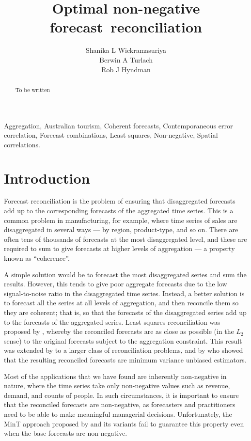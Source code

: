 \documentclass[11pt]{article}
\title{Optimal non-negative forecast~reconciliation}
\author{Shanika L Wickramasuriya\\ Berwin A Turlach\\ Rob J Hyndman}
\newcommand{\0}{\phantom{0}}
\begin{document}
\titlepage

\begin{abstract}
	To be written
\end{abstract}

\begin{keywords}
	Aggregation, Australian tourism, Coherent forecasts, Contemporaneous error correlation, Forecast combinations, Least squares, Non-negative, Spatial correlations.
\end{keywords}


\newpage

\section{Introduction}

Forecast reconciliation is the problem of ensuring that disaggregated forecasts add up to the corresponding forecasts of the aggregated time series. This is a common problem in manufacturing, for example, where time series of sales are disaggregated in several ways --- by region, product-type, and so on. There are often tens of thousands of forecasts at the most disaggregated level, and these are required to sum to give forecasts at higher levels of aggregation --- a property known as ``coherence''.

A simple solution would be to forecast the most disaggregated series and sum the results. However, this tends to give poor aggregate forecasts due to the low signal-to-noise ratio in the disaggregated time series. Instead, a better solution is to forecast all the series at all levels of aggregation, and then reconcile them so they are coherent; that is, so that the forecasts of the disaggregated series add up to the forecasts of the aggregated series. Least squares reconciliation was proposed by \citet{Hyndman2011}, whereby the reconciled forecasts are as close as possible (in the $L_2$ sense) to the original forecasts subject to the aggregation constraint. This result was extended by \citet{Hyndman2016} to a larger class of reconciliation problems, and by \citet{Wick2018} who showed that the resulting reconciled forecasts are minimum variance unbiased estimators.

Most of the applications that we have found are inherently non-negative in nature, where the time series take only non-negative values such as revenue, demand, and counts of people. In such circumstances, it is important to ensure that the reconciled forecasts are non-negative, as forecasters and practitioners need to be able to make meaningful managerial decisions. Unfortunately, the MinT approach proposed by \citet{Wick2018} and its variants fail to guarantee this property even when the base forecasts are non-negative. 
\end{document}
